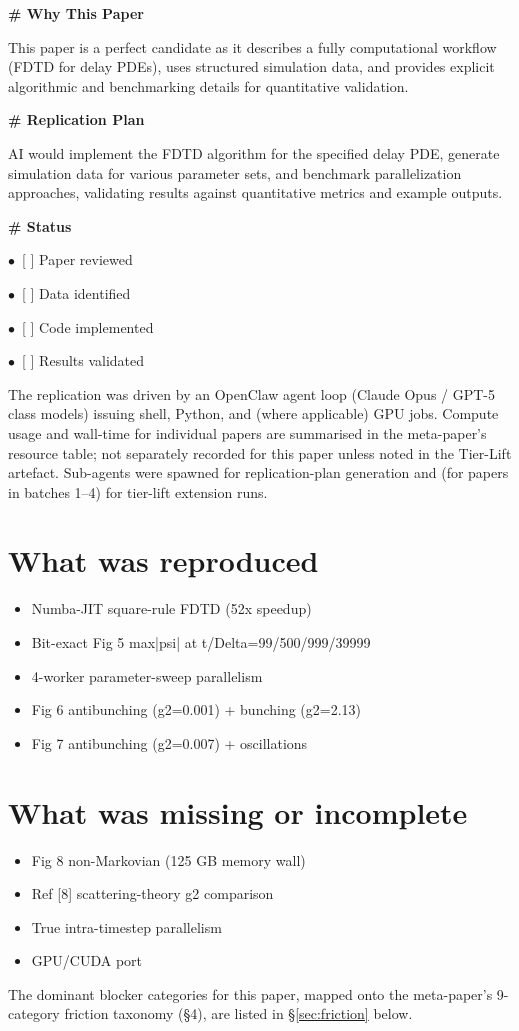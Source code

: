 \documentclass[11pt]{article}
\begin{document}
\par\medskip\textbf{\# Why This Paper}\par
This paper is a perfect candidate as it describes a fully computational workflow (FDTD for delay PDEs), uses structured simulation data, and provides explicit algorithmic and benchmarking details for quantitative validation.

\par\medskip\textbf{\# Replication Plan}\par
AI would implement the FDTD algorithm for the specified delay PDE, generate simulation data for various parameter sets, and benchmark parallelization approaches, validating results against quantitative metrics and example outputs.

\par\medskip\textbf{\# Status}\par
\par$\bullet$\ [ ] Paper reviewed
\par$\bullet$\ [ ] Data identified
\par$\bullet$\ [ ] Code implemented
\par$\bullet$\ [ ] Results validated
\normalsize

The replication was driven by an OpenClaw agent loop (Claude Opus / GPT-5 class models) issuing shell, Python, and (where applicable) GPU jobs. Compute usage and wall-time for individual papers are summarised in the meta-paper's resource table; not separately recorded for this paper unless noted in the Tier-Lift artefact. Sub-agents were spawned for replication-plan generation and (for papers in batches 1--4) for tier-lift extension runs.

\section{What was reproduced}
\begin{itemize}
\item Numba-JIT square-rule FDTD (52x speedup)
\item Bit-exact Fig 5 max|psi| at t/Delta=99/500/999/39999
\item 4-worker parameter-sweep parallelism
\item Fig 6 antibunching (g2=0.001) + bunching (g2=2.13)
\item Fig 7 antibunching (g2=0.007) + oscillations
\end{itemize}

\section{What was missing or incomplete}
\begin{itemize}
\item Fig 8 non-Markovian (125 GB memory wall)
\item Ref [8] scattering-theory g2 comparison
\item True intra-timestep parallelism
\item GPU/CUDA port
\end{itemize}
The dominant blocker categories for this paper, mapped onto the meta-paper's 9-category friction taxonomy (\S4), are listed in \S\ref{sec:friction} below.
\end{document}
